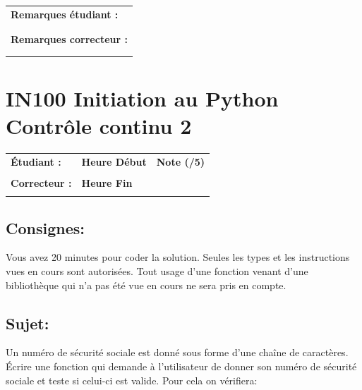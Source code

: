 \documentclass[a4paper,11pt]{article}
\begin{document}
\begin{table}[h!]
\centering
\renewcommand{\arraystretch}{1.4} %
\begin{tabular}{|p{15cm}|}
\hline
\textbf{Remarques étudiant :}    \\
 \\
 \\
\hline
\textbf{Remarques correcteur :}  \\
 \\
 \\
\hline
\end{tabular}
\end{table}

\newpage


\section*{\center IN100 Initiation au Python\\
Contrôle continu 2}


\begin{table}[h!]
\centering
\renewcommand{\arraystretch}{1.4} %
\begin{tabular}{|p{10cm}|p{3cm}|p{2cm}|}
\hline
\textbf{Étudiant :} & \textbf{Heure Début }  & \textbf{Note (/5) }  \\
& & \\
\hline
\textbf{Correcteur :} & \textbf{Heure Fin } & \\
& & \\
\hline

\hline
\end{tabular}
\end{table}

\subsection*{Consignes:} Vous avez 20 minutes pour coder la solution. Seules les types et les instructions vues en cours sont autorisées. Tout usage d'une fonction 
venant d'une bibliothèque qui n'a pas été vue en cours ne sera pris en compte. 


\subsection*{Sujet:}

Un numéro de sécurité sociale est donné sous forme d'une chaîne de caractères. Écrire une fonction qui demande à l’utilisateur de donner son numéro de sécurité
sociale et teste si celui-ci est valide. 
Pour cela on vérifiera: 
\end{document}

